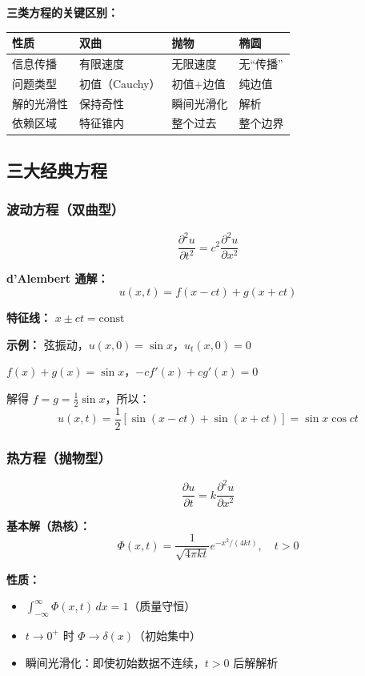 \textbf{三类方程的关键区别：}

\begin{center}
\begin{tabular}{L{2.5cm}L{3.5cm}L{3.5cm}L{3.5cm}}
\toprule
\textbf{性质} & \textbf{双曲} & \textbf{抛物} & \textbf{椭圆} \\
\midrule
信息传播 & 有限速度 & 无限速度 & 无“传播” \\
问题类型 & 初值（Cauchy） & 初值+边值 & 纯边值 \\
解的光滑性 & 保持奇性 & 瞬间光滑化 & 解析 \\
依赖区域 & 特征锥内 & 整个过去 & 整个边界 \\
\bottomrule
\end{tabular}
\end{center}

\subsection{三大经典方程}

\subsubsection{波动方程（双曲型）}

\[
\frac{\partial^2 u}{\partial t^2} = c^2 \frac{\partial^2 u}{\partial x^2}
\]

\textbf{d'Alembert 通解：}
\[
u(x,t) = f(x - ct) + g(x + ct)
\]

\textbf{特征线：} $x \pm ct = \text{const}$

\textbf{示例：} 弦振动，$u(x,0) = \sin x$，$u_t(x,0) = 0$

$f(x) + g(x) = \sin x$，$-cf'(x) + cg'(x) = 0$

解得 $f = g = \frac{1}{2}\sin x$，所以：
\[
u(x,t) = \frac{1}{2}[\sin(x-ct) + \sin(x+ct)] = \sin x \cos ct
\]

\subsubsection{热方程（抛物型）}

\[
\frac{\partial u}{\partial t} = k\frac{\partial^2 u}{\partial x^2}
\]

\textbf{基本解（热核）：}
\[
\Phi(x,t) = \frac{1}{\sqrt{4\pi kt}} e^{-x^2/(4kt)}, \quad t > 0
\]

\textbf{性质：}
\begin{itemize}
  \item $\int_{-\infty}^{\infty} \Phi(x,t)\,dx = 1$（质量守恒）
  \item $t \to 0^+$ 时 $\Phi \to \delta(x)$（初始集中）
  \item 瞬间光滑化：即使初始数据不连续，$t > 0$ 后解解析
\end{itemize}

